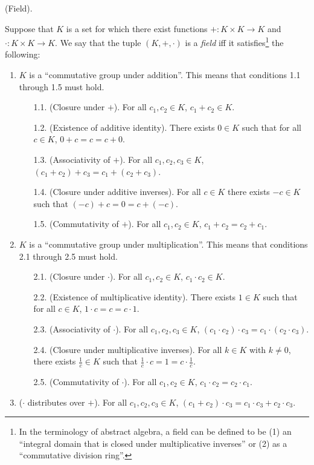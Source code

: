 \begin{defn}
    (Field). 
    
    Suppose that $K$ is a set for which there exist functions $+:K \times K \rightarrow K$ and $\cdot:K \times K \rightarrow K$. We say that the tuple $(K, +, \cdot)$ is a \textit{field} iff it satisfies\footnote{In the terminology of abstract algebra, a field can be defined to be (1) an ``integral domain that is closed under multiplicative inverses'' or (2) as a ``commutative division ring''.} the following:

    \begin{enumerate}
        \item $K$ is a ``commutative group under addition''. This means that conditions 1.1 through 1.5 must hold.
        \begin{enumerate}
            \item[1.1.] (Closure under $+$). For all $c_1, c_2 \in K$, $c_1 + c_2 \in K$.
            \item[1.2.] (Existence of additive identity). There exists $0 \in K$ such that for all $c \in K$, $0 + c = c = c + 0$.
            \item[1.3.] (Associativity of $+$). For all $c_1, c_2, c_3 \in K$, $(c_1 + c_2) + c_3 = c_1 + (c_2 + c_3)$.
            \item[1.4.] (Closure under additive inverses). For all $c \in K$ there exists $-c \in K$ such that $(-c) + c = 0 = c + (-c)$.
            \item[1.5.] (Commutativity of $+$). For all $c_1, c_2 \in K$, $c_1 + c_2 = c_2 + c_1$.
        \end{enumerate}
        \item $K$ is a ``commutative group under multiplication''. This means that conditions 2.1 through 2.5 must hold.
        \begin{enumerate}
            \item[2.1.] (Closure under $\cdot$). For all $c_1, c_2 \in K$, $c_1 \cdot c_2 \in K$.
            \item[2.2.] (Existence of multiplicative identity). There exists $1 \in K$ such that for all $c \in K$, $1 \cdot c = c = c \cdot 1$.
            \item[2.3.] (Associativity of $\cdot$). For all $c_1, c_2, c_3 \in K$, $(c_1 \cdot c_2) \cdot c_3 = c_1 \cdot (c_2 \cdot c_3)$.
            \item[2.4.] (Closure under multiplicative inverses). For all $k \in K$ with $k \neq 0$, there exists $\frac{1}{c} \in K$ such that $\frac{1}{c} \cdot c = 1 = c \cdot \frac{1}{c}$.
            \item[2.5.] (Commutativity of $\cdot$). For all $c_1, c_2 \in K$, $c_1 \cdot c_2 = c_2 \cdot c_1$.
        \end{enumerate}
        \item ($\cdot$ distributes over $+$). For all $c_1, c_2, c_3 \in K$, $(c_1 + c_2) \cdot c_3 = c_1 \cdot c_3 + c_2 \cdot c_3$.
    \end{enumerate}


\end{defn}
